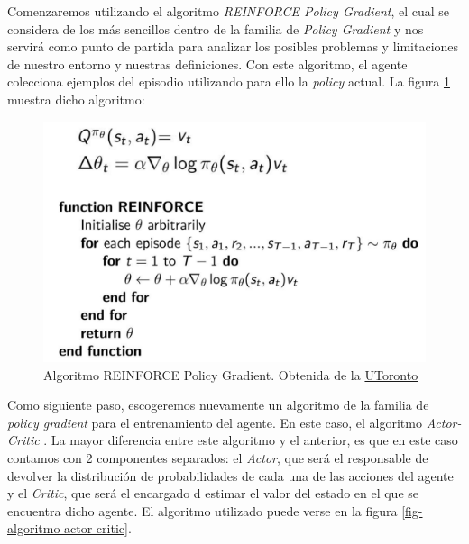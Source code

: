 Comenzaremos utilizando el algoritmo \textit{REINFORCE Policy Gradient}, el cual se considera de los más sencillos dentro de la familia de \textit{Policy Gradient} y nos servirá como punto de partida para analizar los posibles problemas y limitaciones de nuestro entorno y nuestras definiciones. Con este algoritmo, el agente colecciona ejemplos del episodio utilizando para ello la \textit{policy} actual. La figura \ref{fig-algoritmo-reinforce} muestra dicho algoritmo:
\medskip
\begin{figure}[ht!]
	\centering
	\includegraphics[scale=0.5]{figuras/reinforce_policy_gradient.png}
	\caption[Algoritmo REINFORCE Policy Gradient]{Algoritmo REINFORCE Policy Gradient. Obtenida de la \href{http://www.cs.toronto.edu/~tingwuwang/REINFORCE.pdf}{UToronto}}
	\label{fig-algoritmo-reinforce}
\end{figure}

Como siguiente paso, escogeremos nuevamente un algoritmo de la familia de \textit{policy gradient} para el entrenamiento del agente. En este caso, el algoritmo \textit{Actor-Critic} \citep{DBLP:journals/corr/abs-1801-01290}. La mayor diferencia entre este algoritmo y el anterior, es que en este caso contamos con 2 componentes separados: el \textit{Actor}, que será el responsable de devolver la distribución de probabilidades de cada una de las acciones del agente y el \textit{Critic}, que será el encargado d estimar el valor del estado en el que se encuentra dicho agente. El algoritmo utilizado puede verse en la figura \ref{fig-algoritmo-actor-critic}.
\medskip

